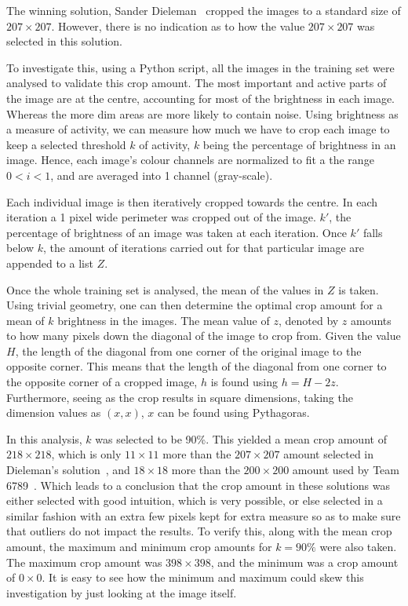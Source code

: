 \documentclass[12pt,a4paper,oneside,oldfontcommands]{memoir}
\begin{document}
The winning solution, Sander Dieleman~\cite{Sanders-GZ} cropped the images to a standard size of \(207\times207\). However, there is no indication as to how the value \(207\times207\) was selected in this solution. 

To investigate this, using a Python script, all the images in the training set were analysed to validate this crop amount. The most important and active parts of the image are at the centre, accounting for most of the brightness in each image. Whereas the more dim areas are more likely to contain noise. Using brightness as a measure of activity, we can measure how much we have to crop each image to keep a selected threshold \(k\) of activity, \(k\) being the percentage of brightness in an image. Hence, each image’s colour channels are normalized to fit a the range \(0 < i < 1\), and are averaged into 1 channel (gray-scale).

Each individual image is then iteratively cropped towards the centre. In each iteration a 1 pixel wide perimeter was cropped out of the image. \(k'\), the percentage of brightness of an image was taken at each iteration. Once \(k'\) falls below \(k\), the amount of iterations carried out for that particular image are appended to a list \(Z\).

Once the whole training set is analysed, the mean of the values in \(Z\) is taken. Using trivial geometry, one can then determine the optimal crop amount for a mean of \(k\) brightness in the images. The mean value of \(z\), denoted by \(z\) amounts to how many pixels down the diagonal of the image to crop from. Given the value \(H\), the length of the diagonal from one corner of the original image to the opposite corner. This means that the length of the diagonal from one corner to the opposite corner of a cropped image, \(h\) is found using \(h = H - 2z\). Furthermore, seeing as the crop results in square dimensions, taking the dimension values as \((x, x)\), \(x\) can be found using Pythagoras. 

In this analysis, \(k\) was selected to be 90\%. This yielded a mean crop amount of \(218\times218\), which is only \(11\times11\) more than the \(207\times207\) amount selected in Dieleman's solution~\cite{Sanders-GZ}, and \(18\times18\) more than the \(200\times200\) amount used by Team 6789~\cite{Nguyen}. Which leads to a conclusion that the crop amount in these solutions was either selected with good intuition, which is very possible, or else selected in a similar fashion with an extra few pixels kept for extra measure so as to make sure that outliers do not impact the results. To verify this, along with the mean crop amount, the maximum and minimum crop amounts for \(k=90\%\) were also taken. The maximum crop amount was \(398\times398\), and the minimum was a crop amount of \(0\times0\). It is easy to see how the minimum and maximum could skew this investigation by just looking at the image itself.  
\end{document}
